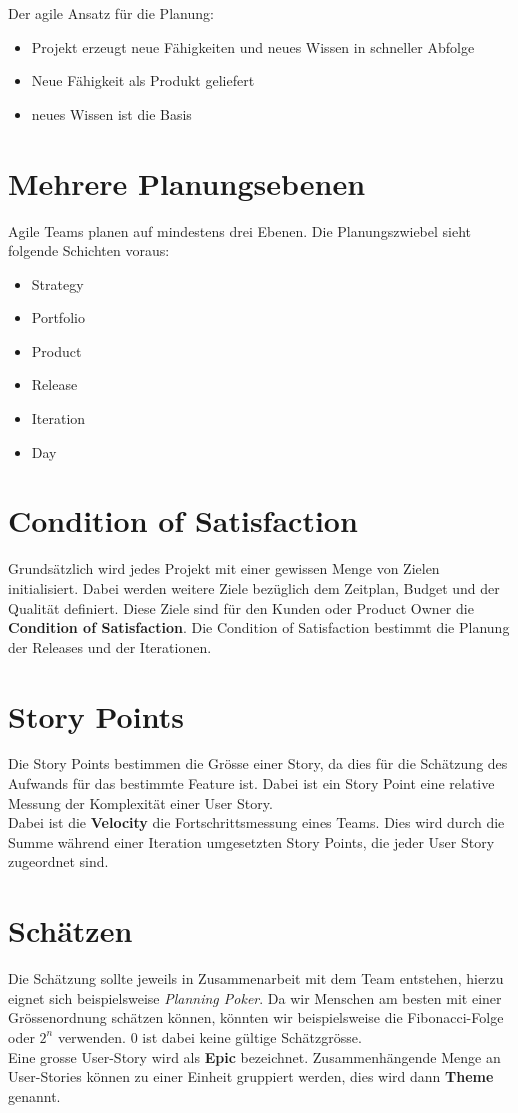 \documentclass{report}
\theoremstyle{definition}
\theoremstyle{example}
\begin{document}
Der agile Ansatz für die Planung:
\begin{itemize}
	\item Projekt erzeugt neue Fähigkeiten und neues Wissen in schneller Abfolge
	\item Neue Fähigkeit als Produkt geliefert
	\item neues Wissen ist die Basis
\end{itemize}

\section{Mehrere Planungsebenen}
Agile Teams planen auf mindestens drei Ebenen. Die Planungszwiebel sieht folgende Schichten voraus:
\begin{itemize}
	\item Strategy
	\item Portfolio
	\item Product
	\item Release
	\item Iteration
	\item Day
\end{itemize}

\section{Condition of Satisfaction}
Grundsätzlich wird jedes Projekt mit einer gewissen Menge von Zielen initialisiert. Dabei werden weitere Ziele bezüglich dem Zeitplan, Budget und der Qualität definiert. Diese Ziele sind für den Kunden oder Product Owner die \textbf{Condition of Satisfaction}. Die Condition of Satisfaction bestimmt die Planung der Releases und der Iterationen.

\section{Story Points}
Die Story Points bestimmen die Grösse einer Story, da dies für die Schätzung des Aufwands für das bestimmte Feature ist. Dabei ist ein Story Point eine relative Messung der Komplexität einer User Story.\\
Dabei ist die \textbf{Velocity} die Fortschrittsmessung eines Teams. Dies wird durch die Summe während einer Iteration umgesetzten Story Points, die jeder  User Story zugeordnet sind.

\section{Schätzen}
Die Schätzung sollte jeweils in Zusammenarbeit mit dem Team entstehen, hierzu eignet sich beispielsweise \textit{Planning Poker}. Da wir Menschen am besten mit einer Grössenordnung schätzen können, könnten wir beispielsweise die Fibonacci-Folge oder $2^n$ verwenden. 0 ist dabei keine gültige Schätzgrösse.\\
Eine grosse User-Story wird als \textbf{Epic} bezeichnet. Zusammenhängende Menge an User-Stories können zu einer Einheit gruppiert werden, dies wird dann \textbf{Theme} genannt.
\end{document}
